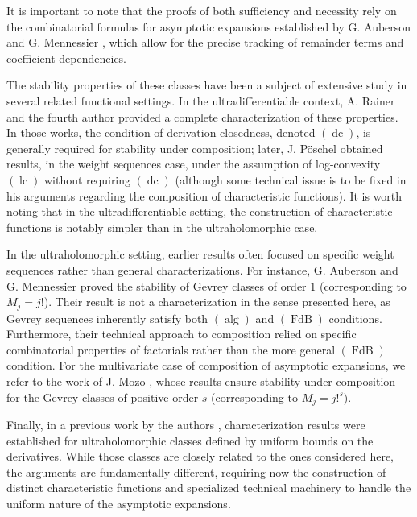 \documentclass[11pt,a4paper]{article}
\theoremstyle{plain}
\theoremstyle{definition}
\let\on=\operatorname
\begin{document}
It is important to note that the proofs of both sufficiency and necessity rely on the combinatorial formulas for asymptotic expansions established by G. Auberson and G. Mennessier \cite{AubersonMennessier81}, which allow for the precise tracking of remainder terms and coefficient dependencies.

The stability properties of these classes have been a subject of extensive study in several related functional settings. In the ultradifferentiable context, A. Rainer and the fourth author \cite{compositionpaper, characterizationstabilitypaper} provided a complete characterization of these properties. In those works, the condition of derivation closedness, denoted \hyperlink{dc}{$(\on{dc})$}, is generally required for stability under composition; later, J. Pöschel \cite{Poschel} obtained results, in the weight sequences case, under the assumption of log-convexity \hyperlink{lc}{$(\on{lc})$} without requiring \hyperlink{dc}{$(\on{dc})$} (although some technical issue is to be fixed in his arguments regarding the composition of characteristic functions). It is worth noting that in the ultradifferentiable setting, the construction of characteristic functions is notably simpler than in the ultraholomorphic case. 

In the ultraholomorphic setting, earlier results often focused on specific weight sequences rather than general characterizations. For instance, G. Auberson and G. Mennessier \cite{AubersonMennessier81} proved the stability of Gevrey classes of order $1$ (corresponding to $M_j = j!$). Their result is not a characterization in the sense presented here, as Gevrey sequences inherently satisfy both \hyperlink{s-alg}{$(\on{alg})$} and \hyperlink{s-FdB}{$(\on{FdB})$} conditions. Furthermore, their technical approach to composition relied on specific combinatorial properties of factorials rather than the more general \hyperlink{s-FdB}{$(\on{FdB})$} condition. For the multivariate case of composition of asymptotic expansions, we refer to the work of J. Mozo \cite{MozoPhd}, whose results ensure stability under composition for the Gevrey classes of positive order $s$ (corresponding to $M_j = j!^s$).

Finally, in a previous work by the authors \cite{ultraholomstab}, characterization results were established for ultraholomorphic classes defined by uniform bounds on the derivatives. While those classes are closely related to the ones considered here, the arguments are fundamentally different, requiring now the construction of distinct characteristic functions and specialized technical machinery to handle the uniform nature of the asymptotic expansions.
\end{document}

